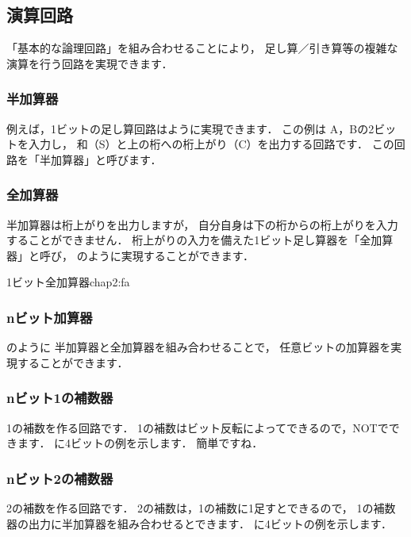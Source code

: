 \subsection{演算回路}
「基本的な論理回路」を組み合わせることにより，
足し算／引き算等の複雑な演算を行う回路を実現できます．

\subsubsection{半加算器}
例えば，1ビットの足し算回路はように実現できます．
この例は A，Bの2ビットを入力し，
和（S）と上の桁への桁上がり（C）を出力する回路です．
この回路を「半加算器」と呼びます．


\subsubsection{全加算器}
半加算器は桁上がりを出力しますが，
自分自身は下の桁からの桁上がりを入力することができません．
桁上がりの入力を備えた1ビット足し算器を「全加算器」と呼び，
のように実現することができます．

          {1ビット全加算器}{chap2:fa}

\subsubsection{nビット加算器}
のように
半加算器と全加算器を組み合わせることで，
任意ビットの加算器を実現することができます．


\subsubsection{nビット1の補数器}
1の補数を作る回路です．
1の補数はビット反転によってできるので，NOTでできます．
に4ビットの例を示します．
簡単ですね．


\subsubsection{nビット2の補数器}
2の補数を作る回路です．
2の補数は，1の補数に1足すとできるので，
1の補数器の出力に半加算器を組み合わせるとできます．
に4ビットの例を示します．

